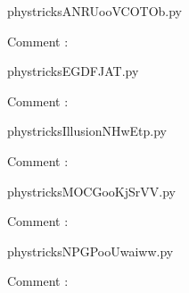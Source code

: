     \clearpage
    


    \newcommand{\CaptionFigANRUooVCOTOb}{<+Type your caption here+>}
    \begin{center}
        
    \end{center}
    phystricksANRUooVCOTOb.py

    Comment : 

    \clearpage
    


    \newcommand{\CaptionFigEGDFJAT}{<+Type your caption here+>}
    \begin{center}
        
    \end{center}
    phystricksEGDFJAT.py

    Comment : 

    \clearpage
    


    \newcommand{\CaptionFigIllusionNHwEtp}{<+Type your caption here+>}
    \begin{center}
        
    \end{center}
    phystricksIllusionNHwEtp.py

    Comment : 

    \clearpage
    


    \newcommand{\CaptionFigMOCGooKjSrVV}{<+Type your caption here+>}
    \begin{center}
        
    \end{center}
    phystricksMOCGooKjSrVV.py

    Comment : 

    \clearpage
    


    \newcommand{\CaptionFigNPGPooUwaiww}{<+Type your caption here+>}
    \begin{center}
        
    \end{center}
    phystricksNPGPooUwaiww.py

    Comment : 

    \clearpage
    



